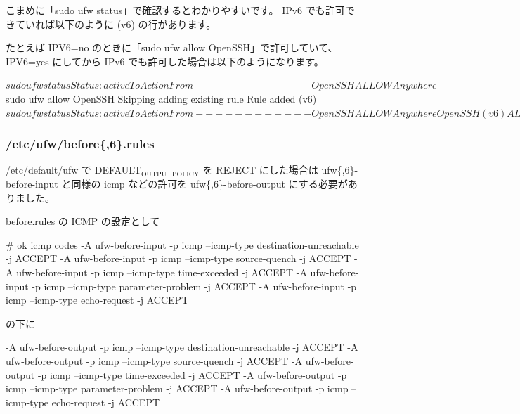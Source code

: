 \documentclass[mingoth,a4paper]{jsarticle}
\begin{document}
こまめに「sudo ufw status」で確認するとわかりやすいです。
IPv6 でも許可できていれば以下のように (v6) の行があります。

たとえば IPV6=no のときに「sudo ufw allow OpenSSH」で許可していて、
IPV6=yes にしてから IPv6 でも許可した場合は以下のようになります。

\begin{commandline}
$ sudo ufw status
Status: active

To                         Action      From
--                         ------      ----
OpenSSH                    ALLOW       Anywhere

$ sudo ufw allow OpenSSH
Skipping adding existing rule
Rule added (v6)
$ sudo ufw status
Status: active

To                         Action      From
--                         ------      ----
OpenSSH                    ALLOW       Anywhere
OpenSSH (v6)               ALLOW       Anywhere (v6)

$
\end{commandline}
\subsubsection{/etc/ufw/before\{,6\}.rules}

/etc/default/ufw で DEFAULT$_{\mathrm{OUTPUT}}$$_{\mathrm{POLICY}}$ を REJECT にした場合は
ufw\{,6\}-before-input と同様の icmp などの許可を
ufw\{,6\}-before-output にする必要がありました。

before.rules の ICMP の設定として

\begin{commandline}
# ok icmp codes
-A ufw-before-input -p icmp --icmp-type destination-unreachable -j ACCEPT
-A ufw-before-input -p icmp --icmp-type source-quench -j ACCEPT
-A ufw-before-input -p icmp --icmp-type time-exceeded -j ACCEPT
-A ufw-before-input -p icmp --icmp-type parameter-problem -j ACCEPT
-A ufw-before-input -p icmp --icmp-type echo-request -j ACCEPT
\end{commandline}

の下に

\begin{commandline}
-A ufw-before-output -p icmp --icmp-type destination-unreachable -j ACCEPT
-A ufw-before-output -p icmp --icmp-type source-quench -j ACCEPT
-A ufw-before-output -p icmp --icmp-type time-exceeded -j ACCEPT
-A ufw-before-output -p icmp --icmp-type parameter-problem -j ACCEPT
-A ufw-before-output -p icmp --icmp-type echo-request -j ACCEPT
\end{commandline}
\end{document}
